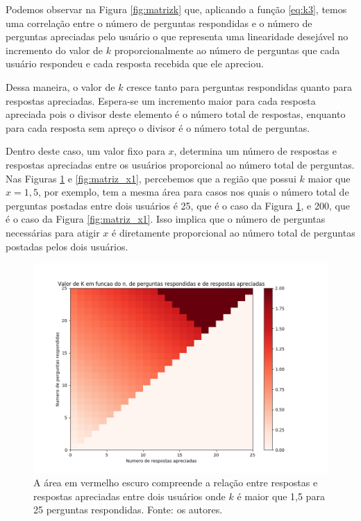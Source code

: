 Podemos observar na Figura \ref{fig:matrizk} que, aplicando a função \ref{eq:k3}, temos uma correlação entre o número de perguntas respondidas e o número de perguntas apreciadas pelo usuário o que representa uma linearidade desejável no incremento do valor de $k$ proporcionalmente ao número de perguntas que cada usuário respondeu e cada resposta recebida que ele apreciou.

Dessa maneira, o valor de $k$ cresce tanto para perguntas respondidas quanto para respostas apreciadas. Espera-se um incremento maior para cada resposta apreciada pois o divisor deste elemento é o número total de respostas, enquanto para cada resposta sem apreço o divisor é o número total de perguntas.

Dentro deste caso, um valor fixo para $x$, determina um número de respostas e respostas apreciadas entre os usuários proporcional ao número total de perguntas. Nas Figuras \ref{fig:matriz_x} e \ref{fig:matriz_x1}, percebemos que a região que possui $k$ maior que $x=1,5$, por exemplo, tem a mesma área para casos nos quais o número total de perguntas postadas entre dois usuários é 25, que é o caso da Figura \ref{fig:matriz_x}, e 200, que é o caso da Figura \ref{fig:matriz_x1}. Isso implica que o número de perguntas necessárias para atigir $x$ é diretamente proporcional ao número total de perguntas postadas pelos dois usuários.
 
\begin{figure}[!htb]
\centering
\includegraphics[width=14cm]{matriz_x.png}
\caption{A área em vermelho escuro compreende a relação entre respostas e respostas apreciadas entre dois usuários onde $k$ é maior que 1,5 para 25 perguntas respondidas. Fonte: os autores.}
\label{fig:matriz_x}
\end{figure}

